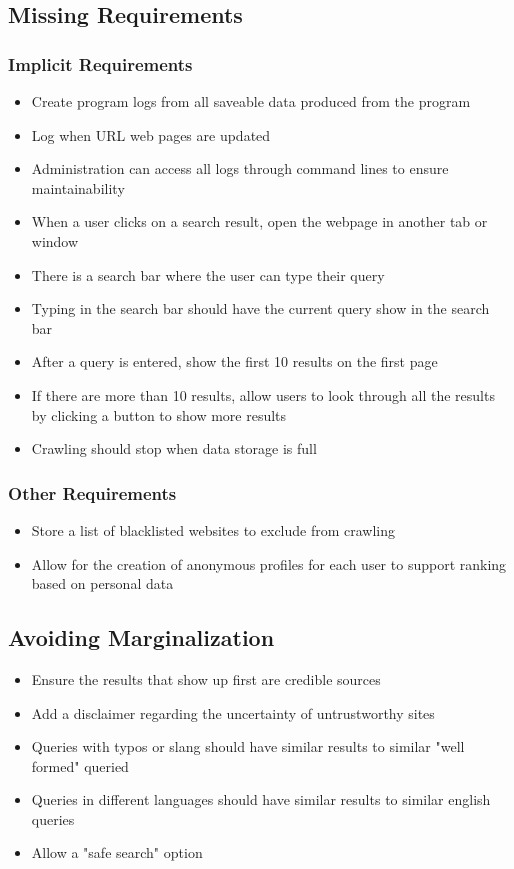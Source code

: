 \subsection*{Missing Requirements}
\subsubsection{Implicit Requirements}
\begin{itemize}
  \item Create program logs from all saveable data produced from the program
  \item Log when URL web pages are updated
  \item Administration can access all logs through command lines to ensure maintainability
  \item When a user clicks on a search result, open the webpage in another tab or window
  \item There is a search bar where the user can type their query
  \item Typing in the search bar should have the current query show in the search bar
  \item After a query is entered, show the first 10 results on the first page
  \item If there are more than 10 results, allow users to look through all the results by clicking a button to show more results
  \item Crawling should stop when data storage is full
\end{itemize}
\subsubsection{Other Requirements}
\begin{itemize}
  \item Store a list of blacklisted websites to exclude from crawling
  \item Allow for the creation of anonymous profiles for each user to support ranking based on personal data
\end{itemize}

\subsection*{Avoiding Marginalization}
\begin{itemize}
  \item Ensure the results that show up first are credible sources
  \item Add a disclaimer regarding the uncertainty of untrustworthy sites
  \item Queries with typos or slang should have similar results to similar "well formed" queried
  \item Queries in different languages should have similar results to similar english queries
  \item Allow a "safe search" option
\end{itemize}